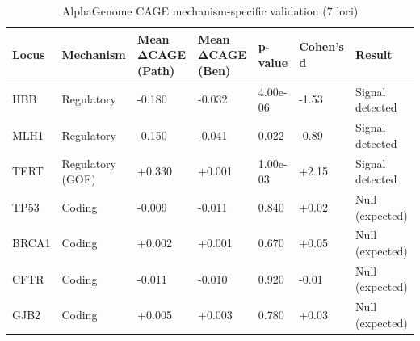 \begin{table}
\caption{AlphaGenome CAGE mechanism-specific validation (7 loci)}
\label{tab:alphagenome}
\begin{tabular}{lllllll}
\toprule
Locus & Mechanism & Mean ΔCAGE (Path) & Mean ΔCAGE (Ben) & p-value & Cohen's d & Result \\
\midrule
HBB & Regulatory & -0.180 & -0.032 & 4.00e-06 & -1.53 & Signal detected \\
MLH1 & Regulatory & -0.150 & -0.041 & 0.022 & -0.89 & Signal detected \\
TERT & Regulatory (GOF) & +0.330 & +0.001 & 1.00e-03 & +2.15 & Signal detected \\
TP53 & Coding & -0.009 & -0.011 & 0.840 & +0.02 & Null (expected) \\
BRCA1 & Coding & +0.002 & +0.001 & 0.670 & +0.05 & Null (expected) \\
CFTR & Coding & -0.011 & -0.010 & 0.920 & -0.01 & Null (expected) \\
GJB2 & Coding & +0.005 & +0.003 & 0.780 & +0.03 & Null (expected) \\
\bottomrule
\end{tabular}
\end{table}
